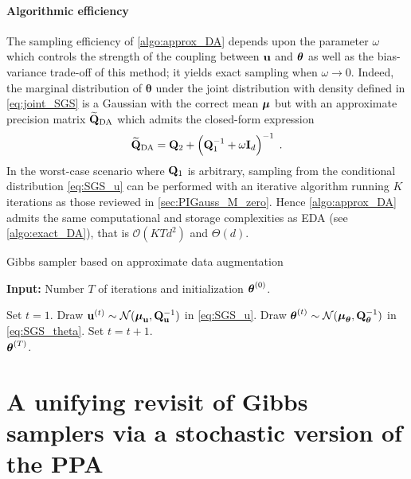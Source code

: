 \documentclass[nohypdvips,onefignum,onetabnum]{siamart171218}
\begin{document}
\paragraph{Algorithmic efficiency}
The sampling efficiency of \cref{algo:approx_DA} depends upon the parameter $\omega$ which controls the strength of the coupling between $\mathbf{u}$ and $\boldsymbol{\theta}$ as well as the bias-variance trade-off of this method; it yields exact sampling when $\omega \rightarrow 0$. 
Indeed, the marginal distribution of $\boldsymbol{\theta}$ under the joint distribution with density defined in \cref{eq:joint_SGS} is a Gaussian with the correct mean $\boldsymbol{\mu}$ but with an approximate precision matrix $\widetilde{\mathbf{Q}}_{\mathrm{DA}}$ which admits the closed-form expression
\begin{equation}
\widetilde{\mathbf{Q}}_{\mathrm{DA}} = \mathbf{Q}_2 + \left(\mathbf{Q}_1^{-1} + \omega\mathbf{I}_d\right)^{-1} \;.
\end{equation}
In the worst-case scenario where $\mathbf{Q}_1$ is arbitrary, sampling from the conditional distribution \cref{eq:SGS_u} can be performed with an iterative algorithm running $K$ iterations as those reviewed in \cref{sec:PIGauss_M_zero}. 
Hence \cref{algo:approx_DA} admits the same computational and storage complexities as EDA (see \cref{algo:exact_DA}), that is $\mathcal{O}(KTd^2)$ and $\Theta(d)$.

\begin{algorithm}
\caption{Gibbs sampler based on approximate data augmentation}
\label{algo:approx_DA}
\hspace*{\algorithmicindent} \textbf{Input:} Number $T$ of iterations and initialization $\boldsymbol{\theta}^{(0)}$.
\begin{algorithmic}[1]
\State Set $t = 1$.
  \State Draw $\mathbf{u}^{(t)} \sim \mathcal{N}(\boldsymbol{\mu}_{\mathbf{u}},\mathbf{Q}_{\mathbf{u}}^{-1})$ {\color{green} in \cref{eq:SGS_u}.}
  \State Draw $\boldsymbol{\theta}^{(t)} \sim \mathcal{N}(\boldsymbol{\mu}_{\boldsymbol{\theta}},\mathbf{Q}_{\boldsymbol{\theta}}^{-1})$ {\color{green} in \cref{eq:SGS_theta}.}
  \State Set $t = t + 1$.
\EndWhile\\
\Return $\boldsymbol{\theta}^{(T)}$.
\end{algorithmic}
\end{algorithm}

\section{A unifying revisit of Gibbs samplers via a stochastic version of the PPA}
\label{sec:PPA}
\end{document}
